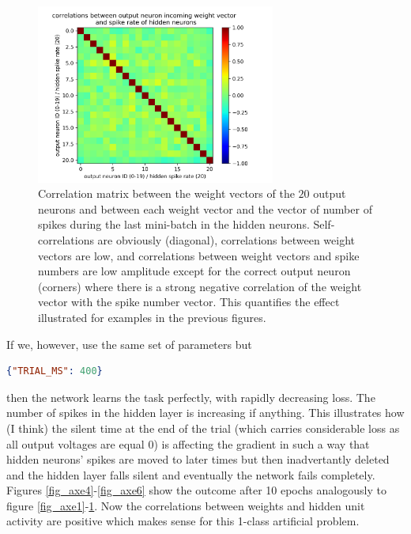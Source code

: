 \documentclass[a4paper]{article}
\begin{document}
  \begin{figure}
    \includegraphics[width=0.7\textwidth]{test_axe1_correlations.png}
    \caption{Correlation matrix between the weight vectors of the $20$ output neurons and between each weight vector and the vector of number of spikes during the last mini-batch in the hidden neurons. Self-correlations are obviously (diagonal), correlations between weight vectors are low, and correlations between weight vectors and spike numbers are low amplitude except for the correct output neuron (corners) where there is a strong negative correlation of the weight vector with the spike number vector. This quantifies the effect illustrated for examples in the previous figures. \label{fig_axe3}}
  \end{figure}
      
  If we, however, use the same set of parameters but
    \begin{lstlisting}[language=json]
      {"TRIAL_MS": 400}
  \end{lstlisting}    
    then the network learns the task perfectly, with rapidly decreasing loss. The number of spikes in the hidden layer is increasing if anything. This illustrates how (I think) the silent time at the end of the trial (which carries considerable loss as all output voltages are equal 0) is affecting the gradient in such a way that hidden neurons' spikes are moved to later times but then inadvertantly deleted and the hidden layer falls silent and eventually the network fails completely. Figures \ref{fig_axe4}-\ref{fig_axe6} show the outcome after 10 epochs analogously to figure \ref{fig_axe1}-\ref{fig_axe3}. Now the correlations between weights and hidden unit activity are positive which makes sense for this 1-class artificial problem.
\end{document}
